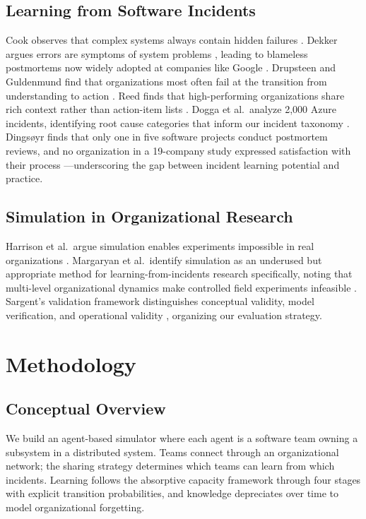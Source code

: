 \documentclass[conference,10pt]{IEEEtran}
\begin{document}
\subsection{Learning from Software Incidents}

Cook observes that complex systems always contain hidden failures \cite{cook1998}. Dekker argues errors are symptoms of system problems \cite{dekker2014}, leading to blameless postmortems now widely adopted at companies like Google \cite{lunney2016}. Drupsteen and Guldenmund find that organizations most often fail at the transition from understanding to action \cite{drupsteen2014}. Reed finds that high-performing organizations share rich context rather than action-item lists \cite{reed2019}. Dogga et al.\ analyze 2,000 Azure incidents, identifying root cause categories that inform our incident taxonomy \cite{dogga2023}. Dings{\o}yr finds that only one in five software projects conduct postmortem reviews, and no organization in a 19-company study expressed satisfaction with their process \cite{dingsoyr2005}---underscoring the gap between incident learning potential and practice.

\subsection{Simulation in Organizational Research}

Harrison et al.\ argue simulation enables experiments impossible in real organizations \cite{harrison2007}. Margaryan et al.\ identify simulation as an underused but appropriate method for learning-from-incidents research specifically, noting that multi-level organizational dynamics make controlled field experiments infeasible \cite{margaryan2017}. Sargent's validation framework distinguishes conceptual validity, model verification, and operational validity \cite{sargent2020}, organizing our evaluation strategy.

\section{Methodology}

\subsection{Conceptual Overview}

We build an agent-based simulator where each agent is a software team owning a subsystem in a distributed system. Teams connect through an organizational network; the sharing strategy determines which teams can learn from which incidents. Learning follows the absorptive capacity framework through four stages with explicit transition probabilities, and knowledge depreciates over time to model organizational forgetting.
\end{document}
